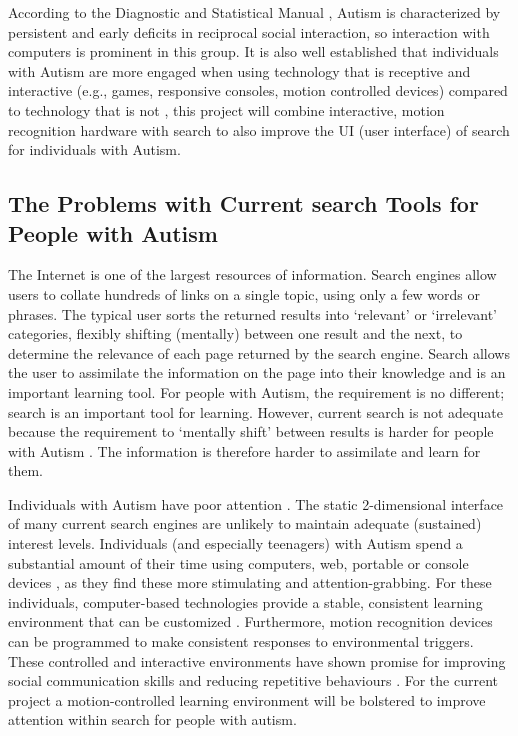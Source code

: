 \documentclass[a4paper, 11pt]{article}
\begin{document}
\begin{justify}
According to the Diagnostic and Statistical Manual \cite{CDC}, Autism is characterized by persistent and early deficits in reciprocal social interaction, so interaction with computers is prominent in this group. It is also well established that individuals with Autism are more engaged when using technology that is receptive and interactive (e.g., games, responsive consoles, motion controlled devices) compared to technology that is not \cite{motioncontrollerforautism}, this project will combine interactive, motion recognition hardware with search to also improve the UI (user interface) of search for individuals with Autism.

\subsection{The Problems with Current search Tools for People with Autism}\label{What should search offer people with Autism}

The Internet is one of the largest resources of information. Search engines allow users to collate hundreds of links on a single topic, using only a few words or phrases. The typical user sorts the returned results into `relevant' or `irrelevant' categories, flexibly shifting (mentally) between one result and the next, to determine the relevance of each page returned by the search engine. Search allows the user to assimilate the information on the page into their knowledge and is an important learning tool. For people with Autism, the requirement is no different; search is an important tool for learning. However, current search is not adequate because the requirement to `mentally shift' between results is harder for people with Autism \cite{disengagement}. The information is therefore harder to assimilate and learn for them. 

Individuals with Autism have poor attention \cite{attention}. The static 2-dimensional interface of many current search engines are unlikely to maintain adequate (sustained) interest levels. Individuals (and especially teenagers) with Autism spend a substantial amount of their time using computers, web, portable or console devices \cite{Shane and Albert}, as they find these more stimulating and attention-grabbing. For these individuals, computer-based technologies provide a stable, consistent learning environment that can be customized \cite{moore}. Furthermore, motion recognition devices can be programmed to make consistent responses to environmental triggers. These controlled and interactive environments have shown promise for improving social communication skills and reducing repetitive behaviours \cite{gameshealth}. For the current project a motion-controlled learning environment will be bolstered to improve attention within search for people with autism. 


\end{justify}
\end{document}
